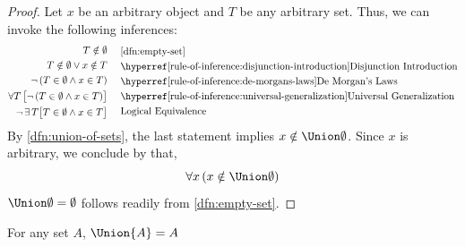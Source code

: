 \begin{proof}
    Let \( x \) be an arbitrary object and \( T \) be any arbitrary set. Thus, we can invoke the following inferences:
    \begin{equation*}
        \begin{aligned}[c]
            T \notin \emptyset& \\
            T \notin \emptyset \lor x \notin T& \\
            \lnot \, \mleft( T \in \emptyset \land x \in T \mright)& \\
            \forall T \, \big[ \lnot \, \mleft( T \in \emptyset \land x \in T \mright) \big]& \\
            \lnot \, \exists \, T \big[ T \in \emptyset \land x \in T \big]& \\
        \end{aligned}
        \text{  }
        \begin{aligned}[c]
            &\quad\text{\cref{dfn:empty-set}} \\
            &\quad\text{\aref{rule-of-inference:disjunction-introduction}{Disjunction Introduction}} \\
            &\quad\text{\aref{rule-of-inference:de-morgans-laws}{De Morgan's Laws}} \\
            &\quad\text{\aref{rule-of-inference:universal-generalization}{Universal Generalization}} \\
            &\quad\text{Logical Equivalence}
        \end{aligned}
    \end{equation*}
    By \cref{dfn:union-of-sets}, the last statement implies \( x \notin \Union \emptyset \).
    Since \( x \) is arbitrary, we conclude by  that,
    \begin{equation*}
        \forall x \, \mleft( x \notin \Union \emptyset \mright)
    \end{equation*}
    \( \Union \emptyset = \emptyset \) follows readily from \cref{dfn:empty-set}.
\end{proof}

\begin{thm}
    \label{thm:union-of-a-singleton}
    For any set \( A \), \( \Union \mleft\{ A \mright\} = A \)
\end{thm}

